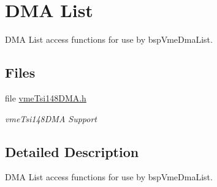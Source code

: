 \hypertarget{group__shared__vmetsi148dma}{}\section{D\+MA List}
\label{group__shared__vmetsi148dma}


D\+MA List access functions for use by bsp\+Vme\+Dma\+List.  


\subsection*{Files}
\begin{DoxyCompactItemize}
\item 
file \mbox{\hyperlink{vmeTsi148DMA_8h}{vme\+Tsi148\+D\+M\+A.\+h}}
\begin{DoxyCompactList}\small\item\em vme\+Tsi148\+D\+MA Support \end{DoxyCompactList}\end{DoxyCompactItemize}


\subsection{Detailed Description}
D\+MA List access functions for use by bsp\+Vme\+Dma\+List. 

